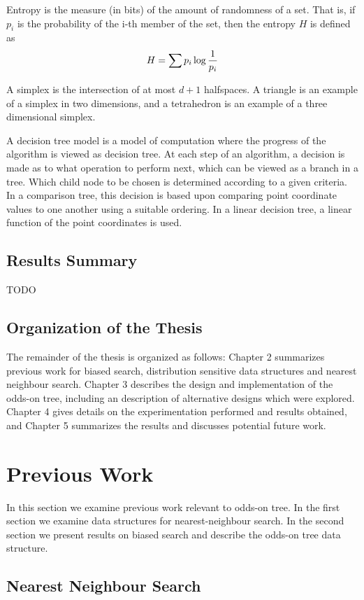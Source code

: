 \documentclass[mcs]{scsthesis}
\begin{document}
Entropy is the measure (in bits) of the amount of randomness of a set.  That is,
if \(p_i\) is the probability of the i-th member of the set, then the entropy
\(H\) is defined as
$$
H = \sum{ p_i \log{1 \over p_i}}
$$

A simplex is the intersection of at most \(d + 1\) halfspaces. A triangle is an
example of a simplex in two dimensions, and a tetrahedron is an example of a
three dimensional simplex.

A decision tree model is a model of computation where the progress of the
algorithm is viewed as decision tree. At each step of an algorithm, a decision
is made as to what operation to perform next, which can be viewed as a branch
in a tree. Which child node to be chosen is determined according to a given
criteria. In a comparison tree, this decision is based upon comparing point
coordinate values to one another using a suitable ordering. In a linear decision
tree, a linear function of the point coordinates is used.

\section{Results Summary}

TODO

\section{Organization of the Thesis}

The remainder of the thesis is organized as follows: Chapter 2 summarizes
previous work for biased search, distribution sensitive data structures and
nearest neighbour search.  Chapter 3 describes the design and implementation of
the odds-on tree, including an description of alternative designs which were
explored.  Chapter 4 gives details on the experimentation performed and results
obtained, and Chapter 5 summarizes the results and discusses potential 
future work.

\chapter{Previous Work}

In this section we examine previous work relevant to odds-on tree. In the first
section we examine data structures for nearest-neighbour search. In the second
section we present results on biased search and describe the odds-on tree data
structure.

\section{Nearest Neighbour Search}
\end{document}
